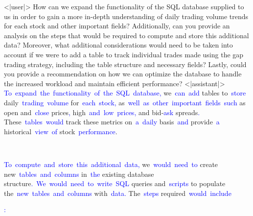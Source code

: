 \documentclass{article}
\begin{document}
\begin{tcolorbox}[colframe=black,colback=white]
<|user|>
How can we expand the functionality of the SQL database supplied to us in order to gain a more in-depth understanding of daily trading volume trends for each stock and other important fields? Additionally, can you provide an analysis on the steps that would be required to compute and store this additional data? Moreover, what additional considerations would need to be taken into account if we were to add a table to track individual trades made using the gap trading strategy, including the table structure and necessary fields? Lastly, could you provide a recommendation on how we can optimize the database to handle the increased workload and maintain efficient performance?
<|assistant|>
\textcolor{blue}{To}\textcolor{blue}{~expand}\textcolor{blue}{~the}\textcolor{blue}{~functionality}\textcolor{blue}{~of}\textcolor{blue}{~the}\textcolor{blue}{~SQL}\textcolor{blue}{~database}\textcolor{blue}{,} we\textcolor{blue}{~can}\textcolor{blue}{~add} tables to\textcolor{blue}{~store} daily\textcolor{blue}{~trading}\textcolor{blue}{~volume} for\textcolor{blue}{~each}\textcolor{blue}{~stock}\textcolor{blue}{,} as\textcolor{blue}{~well}\textcolor{blue}{~as}\textcolor{blue}{~other}\textcolor{blue}{~important}\textcolor{blue}{~fields}\textcolor{blue}{~such} as open and\textcolor{blue}{~close} prices\textcolor{blue}{,} high\textcolor{blue}{~and}\textcolor{blue}{~low}\textcolor{blue}{~prices}\textcolor{blue}{,} and bid-\textcolor{blue}{ask} spreads\textcolor{blue}{.} These\textcolor{blue}{~tables}\textcolor{blue}{~would} track these metrics on\textcolor{blue}{~a}\textcolor{blue}{~daily} basis\textcolor{blue}{~and} provide\textcolor{blue}{~a} historical\textcolor{blue}{~view}\textcolor{blue}{~of} stock\textcolor{blue}{~performance}.\textcolor{blue}{~

}\textcolor{blue}{To}\textcolor{blue}{~compute}\textcolor{blue}{~and}\textcolor{blue}{~store}\textcolor{blue}{~this}\textcolor{blue}{~additional}\textcolor{blue}{~data}\textcolor{blue}{,} we\textcolor{blue}{~would}\textcolor{blue}{~need}\textcolor{blue}{~to} create new\textcolor{blue}{~tables}\textcolor{blue}{~and}\textcolor{blue}{~columns} in\textcolor{blue}{~the} existing database structure\textcolor{blue}{.}\textcolor{blue}{~We}\textcolor{blue}{~would}\textcolor{blue}{~need}\textcolor{blue}{~to}\textcolor{blue}{~write}\textcolor{blue}{~SQL} queries and\textcolor{blue}{~scripts} to populate the\textcolor{blue}{~new}\textcolor{blue}{~tables}\textcolor{blue}{~and}\textcolor{blue}{~columns} with\textcolor{blue}{~data}\textcolor{blue}{.} The\textcolor{blue}{~steps} required\textcolor{blue}{~would}\textcolor{blue}{~include}\textcolor{blue}{:

}
\end{tcolorbox}
\end{document}
